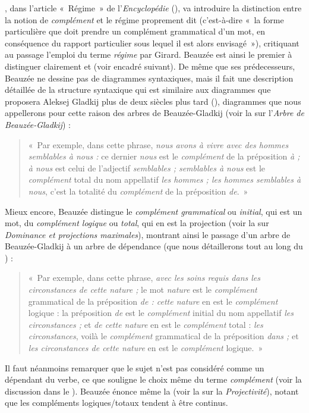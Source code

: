 {    , dans l’article «~Régime~» de l’\textit{Encyclopédie} (\citeyear{Beauzée1765}), va introduire la distinction entre la notion de \textit{complément} et le régime proprement dit (c’est-à-dire «~la forme particulière que doit prendre un complément grammatical d’un mot, en conséquence du rapport particulier sous lequel il est alors envisagé~»), critiquant au passage l’emploi du terme \textit{régime} par Girard. Beauzée est ainsi le premier à distinguer clairement  et  (voir encadré suivant). De même que ses prédecesseurs, Beauzée ne dessine pas de diagrammes syntaxiques, mais il fait une description détaillée de la structure syntaxique qui est similaire aux diagrammes que proposera Aleksej Gladkij plus de deux siècles plus tard (\citeyear{gladkij1968describing}), diagrammes que nous appellerons pour cette raison des arbres de Beauzée-Gladkij (voir la  sur l'\textit{Arbre de Beauzée-Gladkij}) : 
    \begin{quote}
   «~Par exemple, dans cette phrase, \textit{nous avons à vivre avec des hommes semblables à nous :} ce dernier \textit{nous} est le \textit{complément} de la préposition \textit{à ; à nous} est celui de l’adjectif \textit{semblables ; semblables à nous} est le \textit{complément} total du nom appellatif \textit{les hommes ; les hommes semblables à nous}, c’est la totalité du \textit{complément} de la préposition \textit{de}.~»
 \end{quote}
    Mieux encore, Beauzée distingue le \textit{complément grammatical} ou \textit{initial}, qui est un mot, du \textit{complément logique} ou \textit{total}, qui en est la projection (voir la  sur \textit{Dominance et projections maximales}), montrant ainsi le passage d’un arbre de Beauzée-Gladkij à un arbre de dépendance (que nous détaillerons tout au long du ) : 
    \begin{quote}
    «~Par exemple, dans cette phrase, \textit{avec les soins requis dans les circonstances de cette nature ;} le mot \textit{nature} est le \textit{complément} grammatical de la préposition \textit{de : cette nature} en est le \textit{complément} logique : la préposition \textit{de} est le \textit{complément} initial du nom appellatif \textit{les circonstances ;} et \textit{de cette nature} en est le \textit{complément} total : \textit{les circonstances}, voilà le \textit{complément} grammatical de la préposition \textit{dans ;} et \textit{les circonstances de cette nature} en est le \textit{complément} logique.~»
     \end{quote}
     Il faut néanmoins remarquer que le sujet n’est pas considéré comme un dépendant du verbe, ce que souligne le choix même du terme \textit{complément} (voir la discussion dans le ). Beauzée énonce même la  (voir la  sur la \textit{Projectivité}), notant que les compléments logiques/totaux tendent à être continus.

}
